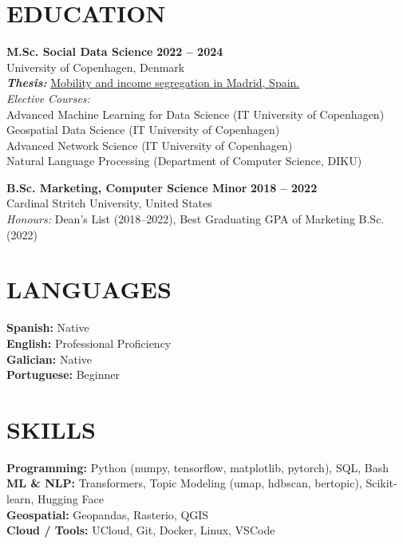 \documentclass{resume}
\begin{document}
\section{EDUCATION} 
\begin{content}
    {\bf M.Sc. Social Data Science} \hfill {\bf 2022 -- 2024} \\
    University of Copenhagen, Denmark \\
    {\bf \em Thesis:} {\href{https://carobs9.github.io/segregation-mobility/}{Mobility and income segregation in Madrid, Spain.}} \\ 
    {\em Elective Courses:} \\
    {\small
    Advanced Machine Learning for Data Science (IT University of Copenhagen) \\ 
    Geospatial Data Science (IT University of Copenhagen) \\
    Advanced Network Science (IT University of Copenhagen) \\
    Natural Language Processing (Department of Computer Science, DIKU) \\
    }


    {\bf B.Sc. Marketing, Computer Science Minor} \hfill {\bf 2018 -- 2022} \\
    Cardinal Stritch University, United States \\
    {\em Honours:} Dean's List (2018--2022), Best Graduating GPA of Marketing B.Sc. (2022)
\end{content}

\section{LANGUAGES} 
\begin{content}
    {\bf Spanish:} Native \\
    {\bf English:} Professional Proficiency  \\
    {\bf Galician:} Native \\
    {\bf Portuguese:} Beginner \\
\end{content}

\section{SKILLS} 
\begin{content}
    {\bf Programming:} Python {\footnotesize (numpy, tensorflow, matplotlib, pytorch)}, SQL, Bash \\
    {\bf ML \& NLP:} Transformers, Topic Modeling {\footnotesize (umap, hdbscan, bertopic)}, Scikit-learn, Hugging Face \\
    {\bf Geospatial:} Geopandas, Rasterio, QGIS \\
    {\bf Cloud / Tools:} UCloud, Git, Docker, Linux, VSCode
\end{content}
\end{document}

